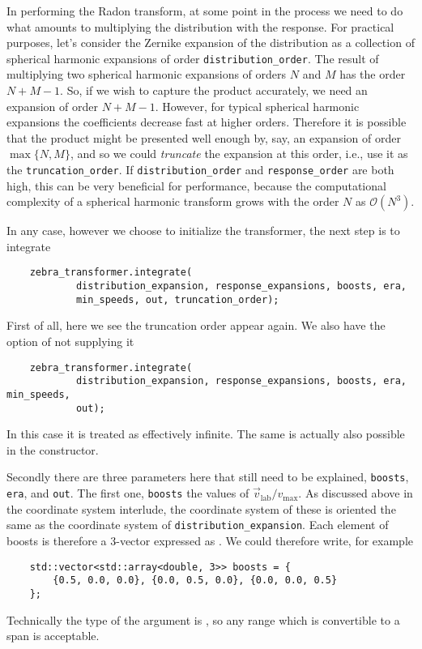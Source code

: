 \documentclass{article}
\begin{document}
In performing the Radon transform, at some point in the process we need to do what amounts to multiplying the distribution with the response. For practical purposes, let's consider the Zernike expansion of the distribution as a collection of spherical harmonic expansions of order \texttt{distribution\_order}. The result of multiplying two spherical harmonic expansions of orders $N$ and $M$ has the order $N + M - 1$. So, if we wish to capture the product accurately, we need an expansion of order $N + M - 1$. However, for typical spherical harmonic expansions the coefficients decrease fast at higher orders. Therefore it is possible that the product might be presented well enough by, say, an expansion of order $\max\{N,M\}$, and so we could \emph{truncate} the expansion at this order, i.e., use it as the \texttt{truncation\_order}. If \texttt{distribution\_order} and \texttt{response\_order} are both high, this can be very beneficial for performance, because the computational complexity of a spherical harmonic transform grows with the order $N$ as $\mathcal{O}(N^3)$.

In any case, however we choose to initialize the transformer, the next step is to integrate
\begin{verbatim}
    zebra_transformer.integrate(
            distribution_expansion, response_expansions, boosts, era,
            min_speeds, out, truncation_order);
\end{verbatim}
First of all, here we see the truncation order appear again. We also have the option of not supplying it
\begin{verbatim}
    zebra_transformer.integrate(
            distribution_expansion, response_expansions, boosts, era, min_speeds,
            out);
\end{verbatim}
In this case it is treated as effectively infinite. The same is actually also possible in the constructor.

Secondly there are three parameters here that still need to be explained, \texttt{boosts}, \texttt{era}, and \texttt{out}. The first one, \texttt{boosts} the values of $\vec{v}_\text{lab}/v_\text{max}$. As discussed above in the coordinate system interlude, the coordinate system of these is oriented the same as the coordinate system of \texttt{distribution\_expansion}. Each element of boosts is therefore a 3-vector expressed as . We could therefore write, for example
\begin{verbatim}
    std::vector<std::array<double, 3>> boosts = {
        {0.5, 0.0, 0.0}, {0.0, 0.5, 0.0}, {0.0, 0.0, 0.5}
    };
\end{verbatim}
Technically the type of the argument is , so any range which is convertible to a span is acceptable.
\end{document}
